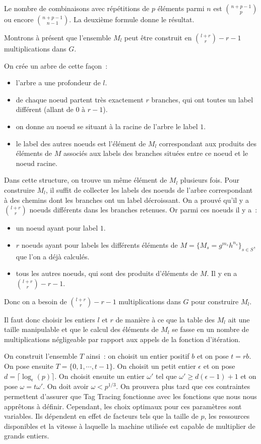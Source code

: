     Le nombre de combinaisons avec répétitions de $p$ éléments parmi $n$ est $\binom{n+p-1}{p}$ ou encore $\binom{n+p-1}{n-1}$. La deuxième formule donne le résultat.

    Montrons à présent que l'ensemble $M_l$ peut être construit en $\binom{l+r}{r} - r - 1$ multiplications dans $G$.

    On crée un arbre de cette façon~:

    \begin{itemize}
      \item l'arbre a une profondeur de $l$.
      \item de chaque noeud partent très exactement $r$ branches, qui ont toutes un label différent (allant de $0$ à $r - 1$).
      \item on donne au noeud se situant à la racine de l'arbre le label $1$.
      \item le label des autres noeuds est l'élément de $M_l$ correspondant aux produits des éléments de $M$ associés aux labels des branches situées entre ce noeud et le noeud racine.
    \end{itemize}

    Dans cette structure, on trouve un même élément de $M_l$ plusieurs fois. Pour construire $M_l$, il suffit de collecter les labels des noeuds de l'arbre correspondant à des chemins dont les branches ont un label décroissant. On a prouvé qu'il y a $\binom{l+r}{r}$ noeuds différents dans les branches retenues. Or parmi ces noeuds il y a~:

    \begin{itemize}
      \item un noeud ayant pour label $1$.
      \item $r$ noeuds ayant pour labels les différents éléments de $M = \{M_s = g^{m_s} h^{n_s}\}_{s \in S}$, que l'on a déjà calculés.
      \item tous les autres noeuds, qui sont des produits d'éléments de $M$. Il y en a $\binom{l+r}{r} - r - 1$.
    \end{itemize}

    Donc on a besoin de $\binom{l+r}{r} - r - 1$ multiplications dans $G$ pour construire $M_l$.

    Il faut donc choisir les entiers $l$ et $r$ de manière à ce que la table des $M_l$ ait une taille manipulable et que le calcul des éléments de $M_l$ se fasse en un nombre de multiplications négligeable par rapport aux appels de la fonction d'itération.

    On construit l'ensemble $T$ ainsi~: on choisit un entier positif $b$ et on pose $t = rb$. On pose ensuite $T = \{0,1,\cdots,t-1\}$. On choisit un petit entier $\epsilon$ et on pose $d = \lceil\log_\epsilon(p)\rceil$. On choisit ensuite un entier $\omega'$ tel que $\omega' \ge d(\epsilon - 1) + 1$ et on pose $\omega = t\omega'$. On doit avoir $\omega < p^{1/3}$. On prouvera plus tard que ces contraintes permettent d'assurer que Tag Tracing fonctionne avec les fonctions que nous nous apprêtons à définir. Cependant, les choix optimaux pour ces paramètres sont variables. Ils dépendent en effet de facteurs tels que la taille de $p$, les ressources disponibles et la vitesse à laquelle la machine utilisée est capable de multiplier de grands entiers.

